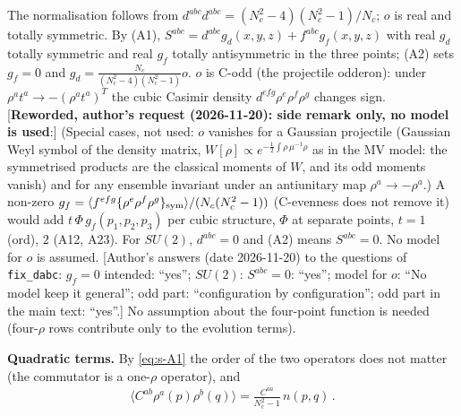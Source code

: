 \documentclass[9pt]{article}
\numberwithin{equation}{section}
\begin{document}
{The normalisation follows from $d^{abc}d^{abc}=(N_{c}^{2}-4)(N_{c}^{2}-1)/N_{c}$; $o$ is real and totally symmetric. By (A1), $S^{abc}=d^{abc}g_{d}(x,y,z)+f^{abc}g_{f}(x,y,z)$ with real $g_{d}$ totally symmetric and real $g_{f}$ totally antisymmetric in the three points; (A2) sets $g_{f}=0$ and $g_{d}=\frac{N_{c}}{(N_{c}^{2}-4)(N_{c}^{2}-1)}o$. $o$ is C-odd (the projectile odderon): under $\rho^{a}t^{a}\to-(\rho^{a}t^{a})^{T}$ the cubic Casimir density $d^{efg}\rho^{e}\rho^{f}\rho^{g}$ changes sign. [\textbf{Reworded, author's request (2026-11-20): side remark only, no model is used}:] (Special cases, not used: $o$ vanishes for a Gaussian projectile (Gaussian Weyl symbol of the density matrix, $W[\rho]\propto e^{-\frac12\int\rho\,\mu^{-1}\rho}$ as in the MV model: the symmetrised products are the classical moments of $W$, and its odd moments vanish) and for any ensemble invariant under an antiunitary map $\rho^{a}\to-\rho^{a}$.) A non-zero $g_{f}=\langle f^{efg}\{\rho^{e}\rho^{f}\rho^{g}\}_{\rm sym}\rangle/(N_{c}(N_{c}^{2}-1))$ (C-evenness does not remove it) would add $t\,\Phi\,g_{f}(p_{1},p_{2},p_{3})$ per cubic structure, $\Phi$ at separate points, $t=1$ (ord), $2$ (A12, A23). For $SU(2)$, $d^{abc}=0$ and (A2) means $S^{abc}=0$. No model for $o$ is assumed. [Author's answers (date 2026-11-20) to the questions of \texttt{fix\_dabc}: $g_{f}=0$ intended: ``yes''; $SU(2)$: $S^{abc}=0$: ``yes''; model for $o$: ``No model keep it general''; odd part: ``configuration by configuration''; odd part in the main text: ``yes''.] No assumption about the four-point function is needed (four-$\rho$ rows contribute only to the evolution terms).

\noindent\textbf{Quadratic terms.} By \eqref{eq:s-A1} the order of the two operators does not matter (the commutator is a one-$\rho$ operator), and
\begin{align}
\langle C^{ab}\rho^{a}(p)\rho^{b}(q)\rangle=\frac{C^{aa}}{N_{c}^{2}-1}\,n(p,q)\,.\label{eq:s-quad}
\end{align}

}
\end{document}
